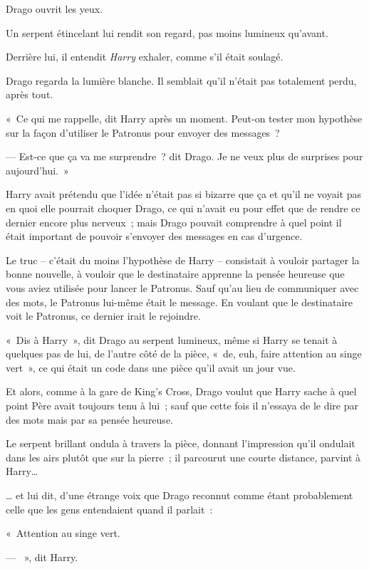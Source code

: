 Drago ouvrit les yeux.

Un serpent étincelant lui rendit son regard, pas moins lumineux qu'avant.

Derrière lui, il entendit \emph{Harry} exhaler, comme s'il était soulagé.

Drago regarda la lumière blanche.
Il semblait qu'il n'était pas totalement perdu, après tout.

«~Ce qui me rappelle, dit Harry après un moment.
Peut-on tester mon hypothèse sur la façon d'utiliser le Patronus pour envoyer des messages~?

--- Est-ce que ça va me surprendre~? dit Drago.
Je ne veux plus de surprises pour aujourd'hui.~»

\later

Harry avait prétendu que l'idée n'était pas si bizarre que ça et qu'il ne voyait pas en quoi elle pourrait choquer Drago, ce qui n'avait eu pour effet que de rendre ce dernier encore plus nerveux~; mais Drago pouvait comprendre à quel point il était important de pouvoir s'envoyer des messages en cas d'urgence.

Le truc -- c'était du moins l'hypothèse de Harry -- consistait à vouloir partager la bonne nouvelle, à vouloir que le destinataire apprenne la pensée heureuse que vous aviez utilisée pour lancer le Patronus.
Sauf qu'au lieu de communiquer avec des mots, le Patronus lui-même était le message.
En voulant que le destinataire voit le Patronus, ce dernier irait le rejoindre.

«~Dis à Harry~», dit Drago au serpent lumineux, même si Harry se tenait à quelques pas de lui, de l'autre côté de la pièce, «~de, euh, faire attention au singe vert~», ce qui était un code dans une pièce qu'il avait un jour vue.

Et alors, comme à la gare de King's Cross, Drago voulut que Harry sache à quel point Père avait toujours tenu à lui~; sauf que cette fois il n'essaya de le dire par des mots mais par sa pensée heureuse.

Le serpent brillant ondula à travers la pièce, donnant l'impression qu'il ondulait dans les airs plutôt que sur la pierre~; il parcourut une courte distance, parvint à Harry…

… et lui dit, d'une étrange voix que Drago reconnut comme étant probablement celle que les gens entendaient quand il parlait~:

«~Attention au singe vert.

--- ~», dit Harry.

